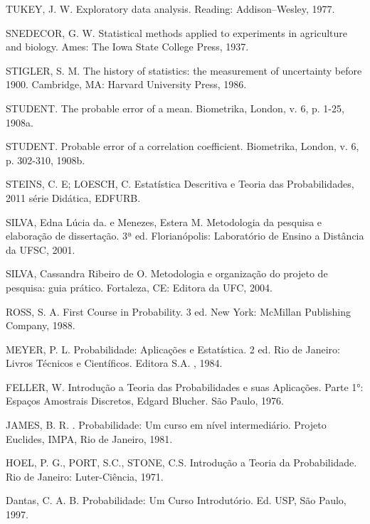 TUKEY, J. W. Exploratory data analysis. Reading: Addison–Wesley, 1977.\vskip0.3cm

SNEDECOR, G. W. Statistical methods applied to experiments in agriculture and biology. Ames: The Iowa State College Press, 1937. \vskip0.3cm

STIGLER, S. M. The history of statistics: the measurement of uncertainty before 1900. Cambridge, MA: Harvard University Press, 1986. \vskip0.3cm

STUDENT. The probable error of a mean. Biometrika, London, v. 6, p. 1-25, 1908a.\vskip0.3cm

STUDENT. Probable error of a correlation coefficient. Biometrika, London, v. 6, p. 302-310, 1908b.\vskip0.3cm

STEINS, C. E; LOESCH, C. Estatística Descritiva e Teoria das Probabilidades, 2011 série Didática, EDFURB.\vskip0.3cm

SILVA, Edna Lúcia da. e Menezes, Estera M. Metodologia da pesquisa e elaboração de dissertação. 3ª ed. Florianópolis: Laboratório de Ensino a Distância da UFSC, 2001.\vskip0.3cm

SILVA, Cassandra Ribeiro de O. Metodologia e organização do projeto de pesquisa: guia prático. Fortaleza, CE: Editora da UFC, 2004.\vskip0.3cm

ROSS, S. A. First Course in Probability. 3 ed. New York:
McMillan Publishing Company, 1988.\vskip0.3cm

MEYER, P. L. Probabilidade: Aplicações e Estatística. 2 ed.
Rio de Janeiro: Livros Técnicos e Científicos. Editora S.A. ,
1984.\vskip0.3cm


FELLER, W. Introdução a Teoria das Probabilidades e suas
Aplicações. Parte 1°: Espaços Amostrais Discretos, Edgard Blucher.
São Paulo, 1976.\vskip0.3cm

JAMES, B. R. . Probabilidade: Um curso em nível intermediário.
Projeto Euclides, IMPA, Rio de Janeiro, 1981. \vskip0.3cm

HOEL, P. G., PORT, S.C., STONE, C.S. Introdução a Teoria da Probabilidade. Rio de
Janeiro: Luter-Ciência, 1971.\vskip0.3cm

Dantas, C. A. B. Probabilidade: Um Curso Introdutório. Ed.
USP, São Paulo, 1997.